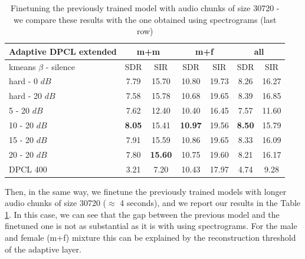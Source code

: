\documentclass[master, tikz, final,11pt, dvipdfmx]{iscs-thesis}
\begin{document}
\begin{table}[h!]
\centering
\begin{tabular}{l|c|c|c|c|c|c}
Adaptive DPCL extended & \multicolumn{2}{c|}{m+m} & \multicolumn{2}{c|}{m+f} & \multicolumn{2}{c}{all} \\ 
\hline 
kmeans $\beta$ - silence & SDR & SIR & SDR & SIR & SDR & SIR \\ 
\hline 
hard - 0 $dB$ & 7.79 & 15.70 & 10.80 & 19.73 & 8.26 & 16.27 \\  
hard - 20 $dB$ & 7.58 & 15.78 & 10.68 & 19.65 & 8.39 & 16.85 \\ 
\hline 
\hline 
5 - 20 $dB$ & 7.62 & 12.40 & 10.40 & 16.45 & 7.57 & 11.60 \\ 
10 - 20 $dB$ & \cellcolor{green}\textbf{8.05} & \cellcolor{green}15.41 & \cellcolor{green}\textbf{10.97} & \cellcolor{green}19.56 & \cellcolor{green}\textbf{8.50} & \cellcolor{green}15.79 \\ 
15 - 20 $dB$ & 7.91 & 15.59 & 10.86 & 19.65 & 8.33 & 16.09 \\ 
20 - 20 $dB$ & 7.80 & \textbf{15.60} & 10.75 & 19.60 & 8.21 & 16.17 \\ 
\hline 
\hline 
DPCL 400 & 3.21 & 7.20 & 10.43 & 17.97 & 4.74 & 9.28 \\ 
\end{tabular}
\captionsetup{justification=centering}
\caption{Finetuning the previously trained model with audio chunks of size 30720 - we compare these results with the one obtained using spectrograms (last row) }
\label{table:AdaptDPCLext}
\end{table}

Then, in the same way, we finetune the previously trained models with longer audio chunks of size 30720 ($\approx$ 4 seconds), and we report our results in the Table \ref{table:AdaptDPCLext}. In this case, we can see that the gap between the previous model and the finetuned one is not as substantial as it is with using spectrograms. For the male and female (m+f) mixture this can be explained by the reconstruction threshold of the adaptive layer.
\end{document}
